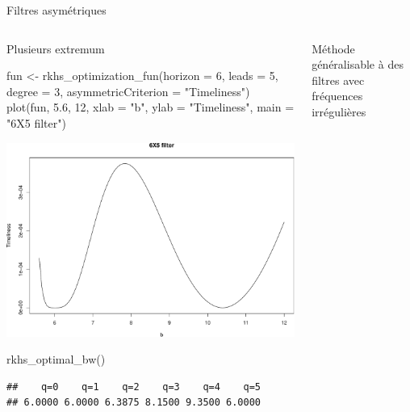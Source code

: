 \documentclass[10pt,xcolor=table,color={dvipsnames,usenames},ignorenonframetext,usepdftitle=false,french]{beamer}
\newenvironment{Shaded}{\begin{snugshade}}{\end{snugshade}}
\newcommand{\AttributeTok}[1]{\textcolor[rgb]{0.77,0.63,0.00}{#1}}
\newcommand{\DecValTok}[1]{\textcolor[rgb]{0.00,0.00,0.81}{#1}}
\newcommand{\FloatTok}[1]{\textcolor[rgb]{0.00,0.00,0.81}{#1}}
\newcommand{\FunctionTok}[1]{\textcolor[rgb]{0.00,0.00,0.00}{#1}}
\newcommand{\NormalTok}[1]{#1}
\newcommand{\OtherTok}[1]{\textcolor[rgb]{0.56,0.35,0.01}{#1}}
\newcommand{\StringTok}[1]{\textcolor[rgb]{0.31,0.60,0.02}{#1}}
\newcommand\1{\mathds{1}}
\begin{document}
\begin{frame}[fragile]{Filtres asymétriques}
\protect\hypertarget{filtres-asymuxe9triques}{}
\begin{columns}[T]
\begin{column}{0.65\textwidth}
\bcsmmh Plusieurs extremum

\footnotesize

\begin{Shaded}
\begin{Highlighting}[]
\NormalTok{fun }\OtherTok{\textless{}{-}} \FunctionTok{rkhs\_optimization\_fun}\NormalTok{(}\AttributeTok{horizon =} \DecValTok{6}\NormalTok{, }
            \AttributeTok{leads =} \DecValTok{5}\NormalTok{, }\AttributeTok{degree =} \DecValTok{3}\NormalTok{, }
            \AttributeTok{asymmetricCriterion =} \StringTok{"Timeliness"}\NormalTok{)}
\FunctionTok{plot}\NormalTok{(fun, }\FloatTok{5.6}\NormalTok{, }\DecValTok{12}\NormalTok{, }\AttributeTok{xlab =} \StringTok{"b"}\NormalTok{, }
     \AttributeTok{ylab =} \StringTok{"Timeliness"}\NormalTok{, }\AttributeTok{main =} \StringTok{"6X5 filter"}\NormalTok{)}
\end{Highlighting}
\end{Shaded}

\begin{center}\includegraphics[height=0.4\paperheight]{img/rkhstimeliness-1} \end{center}

\begin{Shaded}
\begin{Highlighting}[]
\FunctionTok{rkhs\_optimal\_bw}\NormalTok{()}
\end{Highlighting}
\end{Shaded}

\begin{verbatim}
##    q=0    q=1    q=2    q=3    q=4    q=5 
## 6.0000 6.0000 6.3875 8.1500 9.3500 6.0000
\end{verbatim}
\end{column}

\begin{column}{0.3\textwidth}
\bigskip

\bcsmbh Méthode généralisable à des filtres avec fréquences irrégulières
\end{column}
\end{columns}
\end{frame}
\end{document}
